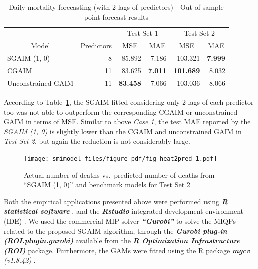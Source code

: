 \documentclass[11pt,a4paper,]{article}
\begin{document}
\hypertarget{tbl-heat2}{}
\begin{table}[!h]
\caption{\label{tbl-heat2}Daily mortality forecasting (with 2 lags of predictors) - Out-of-sample
point forecast results }\tabularnewline

\centering
\begin{tabular}{lr>{}r>{}r>{}r>{}r}
\toprule
\multicolumn{1}{c}{} & \multicolumn{1}{c}{} & \multicolumn{2}{c}{Test Set 1} & \multicolumn{2}{c}{Test Set 2} \\
\cmidrule(l{3pt}r{3pt}){3-4} \cmidrule(l{3pt}r{3pt}){5-6}
\multicolumn{1}{c}{Model} & \multicolumn{1}{c}{Predictors} & \multicolumn{1}{c}{MSE} & \multicolumn{1}{c}{MAE} & \multicolumn{1}{c}{MSE} & \multicolumn{1}{c}{MAE}\\
\midrule
SGAIM (1, 0) & 8 & 85.892 & 7.186 & 103.321 & \textbf{7.999}\\
CGAIM & 11 & 83.625 & \textbf{7.011} & \textbf{101.689} & 8.032\\
Unconstrained GAIM & 11 & \textbf{83.458} & 7.066 & 103.036 & 8.066\\
\bottomrule
\end{tabular}
\end{table}

According to Table~\ref{tbl-heat2}, the SGAIM fitted considering only 2
lags of each predictor too was not able to outperform the corresponding
CGAIM or unconstrained GAIM in terms of MSE. Similar to above \emph{Case
1}, the test MAE reported by the \emph{SGAIM (1, 0)} is slightly lower
than the CGAIM and unconstrained GAIM in \emph{Test Set 2}, but again
the reduction is not considerably large.

\begin{figure}

{\centering \texttt{[image: smimodel\_files/figure-pdf/fig-heat2pred-1.pdf]}

}

\caption{\label{fig-heat2pred}Actual number of deaths vs.~predicted
number of deaths from ``SGAIM (1, 0)'' and benchmark models for Test Set
2}

\end{figure}

Both the empirical applications presented above were performed using
\textbf{\emph{R statistical software}} \autocite{R2023}, and the
\textbf{\emph{Rstudio}} integrated development environment (IDE)
\autocite{Rstudio2023}. We used the commercial MIP solver
\textbf{\emph{``Gurobi''}} \autocite{gurobi2023} to solve the MIQPs
related to the proposed SGAIM algorithm, through the
\textbf{\emph{Gurobi plug-in (ROI.plugin.gurobi)}}
\autocite{Schwendinger2023} available from the \textbf{\emph{R
Optimization Infrastructure (ROI)}} \autocite{Hornik2023,Theusl2020}
package. Furthermore, the GAMs were fitted using the R package
\textbf{\emph{mgcv}} \emph{(v1.8.42)} \autocite{Wood2011}.
\end{document}
